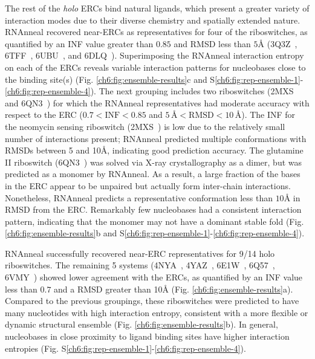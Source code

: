The rest of the {\it holo} ERCs bind natural ligands, which present a greater variety of interaction modes due to their diverse chemistry and spatially extended nature. RNAnneal recovered near-ERCs as representatives for four of the riboswitches, as quantified by an INF value greater than $0.85$ and RMSD less than $5${\AA} (3Q3Z~\cite{Smith2010}, 6TFF~\cite{Huang2020}, 6UBU~\cite{Matyjasik2019}, and 6DLQ~\cite{Peselis2018}). Superimposing the RNAnneal interaction entropy on each of the ERCs reveals variable interaction patterns for nucleobases close to the binding site(s) (Fig. \ref{ch6:fig:ensemble-results}c and S\ref{ch6:fig:rep-ensemble-1}-\ref{ch6:fig:rep-ensemble-4}). The next grouping includes two riboswitches (2MXS~\cite{Schmidtke2015} and 6QN3~\cite{Huang2019}) for which the RNAnneal representatives had moderate accuracy with respect to the ERC ($0.7<\mathrm{INF}<0.85$ and $5\,\text{\AA}<\mathrm{RMSD}<10\,\text{\AA}$). The INF for the neomycin sensing riboswitch (2MXS~\cite{Schmidtke2015}) is low due to the relatively small number of interactions present; RNAnneal predicted multiple conformations with RMSDs between 5 and 10{\AA}, indicating good prediction accuracy. The glutamine II riboswitch (6QN3~\cite{Huang2019}) was solved via X-ray crystallography as a dimer, but was predicted as a monomer by RNAnneal. As a result, a large fraction of the bases in the ERC appear to be unpaired but actually form inter-chain interactions. Nonetheless, RNAnneal predicts a representative conformation less than $10${\AA} in RMSD from the ERC. Remarkably few nucleobases had a consistent interaction pattern, indicating that the monomer may not have a dominant stable fold (Fig. \ref{ch6:fig:ensemble-results}b and S\ref{ch6:fig:rep-ensemble-1}-\ref{ch6:fig:rep-ensemble-4}).

RNAnneal successfully recovered near-ERC representatives for 9/14 holo riboswitches. The remaining 5 systems (4NYA~\cite{Warner2014}, 4YAZ~\cite{ren2015structural}, 6E1W~\cite{Numata2019}, 6Q57~\cite{Dunstan2018}, 6VMY~\cite{Chan2020}) showed lower agreement with the ERCs, as quantified by an INF value less than $0.7$ and a RMSD greater than 10{\AA} (Fig. \ref{ch6:fig:ensemble-results}a). Compared to the previous groupings, these riboswitches were predicted to have many nucleotides with high interaction entropy, consistent with a more flexible or dynamic structural ensemble (Fig. \ref{ch6:fig:ensemble-results}b). In general, nucleobases in close proximity to ligand binding sites have higher interaction entropies (Fig. S\ref{ch6:fig:rep-ensemble-1}-\ref{ch6:fig:rep-ensemble-4}).

